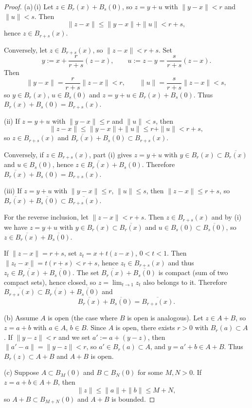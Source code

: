 \documentclass[12pt,a4paper]{article}
\theoremstyle{plain}
\theoremstyle{definition}
\theoremstyle{remark}
\theoremstyle{remark}
\begin{document}
\begin{proof}
	(a)\,(i)\;
	Let $z\in B_r(x)+B_s(0)$, so $z=y+u$ with $\|y-x\|<r$ and $\|u\|<s$.
	Then
	\[
	\|z-x\|\le \|y-x\|+\|u\|<r+s,
	\]
	hence $z\in B_{r+s}(x)$.
	
	Conversely, let $z\in B_{r+s}(x)$, so $\|z-x\|<r+s$.
	Set
	\[
	y:=x+\frac{r}{r+s}(z-x), \qquad
	u:=z-y=\frac{s}{r+s}(z-x).
	\]
	Then
	\[
	\|y-x\|=\frac{r}{r+s}\|z-x\|<r,\qquad
	\|u\|=\frac{s}{r+s}\|z-x\|<s,
	\]
	so $y\in B_r(x)$, $u\in B_s(0)$ and $z=y+u\in B_r(x)+B_s(0)$.
	Thus $B_r(x)+B_s(0)=B_{r+s}(x)$.
	
	\smallskip
	(ii)\;
	If $z=y+u$ with $\|y-x\|\le r$ and $\|u\|<s$, then
	\[
	\|z-x\|\le \|y-x\|+\|u\|\le r+\|u\|<r+s,
	\]
	so $z\in B_{r+s}(x)$ and
	$\overline{B_r(x)}+B_s(0)\subset B_{r+s}(x)$.
	
	Conversely, if $z\in B_{r+s}(x)$, part (i) gives $z=y+u$ with
	$y\in B_r(x)\subset\overline{B_r(x)}$ and $u\in B_s(0)$, hence
	$z\in\overline{B_r(x)}+B_s(0)$. Therefore
	$\overline{B_r(x)}+B_s(0)=B_{r+s}(x)$.
	
	\smallskip
	(iii)\;
	If $z=y+u$ with $\|y-x\|\le r$, $\|u\|\le s$, then
	$\|z-x\|\le r+s$, so
	$\overline{B_r(x)}+\overline{B_s(0)}\subset\overline{B_{r+s}(x)}$.
	
	For the reverse inclusion, let $\|z-x\|<r+s$. Then
	$z\in B_{r+s}(x)$ and by (i) we have $z=y+u$ with
	$y\in B_r(x)\subset\overline{B_r(x)}$ and
	$u\in B_s(0)\subset\overline{B_s(0)}$, so
	$z\in\overline{B_r(x)}+\overline{B_s(0)}$.
	
	If $\|z-x\|=r+s$, set $z_t=x+t(z-x)$, $0<t<1$.
	Then $\|z_t-x\|=t(r+s)<r+s$, hence $z_t\in B_{r+s}(x)$ and thus
	$z_t\in\overline{B_r(x)}+\overline{B_s(0)}$.
	The set $\overline{B_r(x)}+\overline{B_s(0)}$ is compact (sum of two
	compact sets), hence closed, so $z=\lim_{t\to1}z_t$ also belongs to it.
	Therefore $\overline{B_{r+s}(x)}\subset
	\overline{B_r(x)}+\overline{B_s(0)}$ and
	\[
	\overline{B_r(x)}+\overline{B_s(0)}=\overline{B_{r+s}(x)}.
	\]
	
	\medskip
	(b)\;
	Assume $A$ is open (the case where $B$ is open is analogous).
	Let $z\in A+B$, so $z=a+b$ with $a\in A$, $b\in B$.
	Since $A$ is open, there exists $r>0$ with $B_r(a)\subset A$.
	If $\|y-z\|<r$ and we set $a':=a+(y-z)$, then
	$\|a'-a\|=\|y-z\|<r$, so $a'\in B_r(a)\subset A$, and
	$y=a'+b\in A+B$. Thus $B_r(z)\subset A+B$ and $A+B$ is open.
	
	\medskip
	(c)\;
	Suppose $A\subset B_M(0)$ and $B\subset B_N(0)$ for some $M,N>0$.
	If $z=a+b\in A+B$, then
	\[
	\|z\|\le\|a\|+\|b\|\le M+N,
	\]
	so $A+B\subset B_{M+N}(0)$ and $A+B$ is bounded.
	

\end{proof}
\end{document}
